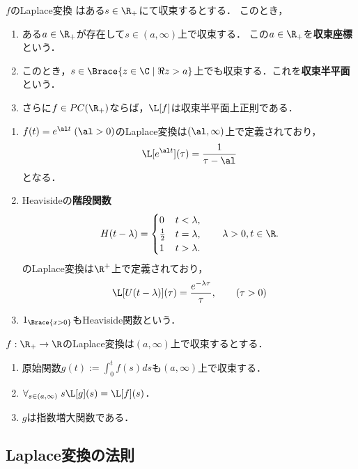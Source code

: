 \documentclass[uplatex,dvipdfmx]{jsreport}
\begin{document}
\begin{theorem}[Laplace変換の収束領域]
    $f$のLaplace変換
    はある$s\in\R_+$にて収束するとする．
    このとき，
    \begin{enumerate}
        \item ある$a\in\R_+$が存在して$s\in(a,\infty)$上で収束する．
        この$a\in\R_+$を\textbf{収束座標}という．
        \item このとき，$s\in\Brace{z\in\C\mid\Re z>a}$上でも収束する．これを\textbf{収束半平面}という．
        \item さらに$f\in PC(\R_+)$ならば，$\L[f]$は収束半平面上正則である．
    \end{enumerate}
\end{theorem}

\begin{example}[Heaviside]\mbox{}
    \begin{enumerate}
        \item $f(t)=e^{\al t}\;(\al>0)$のLaplace変換は$(\al,\infty)$上で定義されており，
        \[\L[e^{\al t}](\tau)=\frac{1}{\tau-\al}\]
        となる．
        \item Heavisideの\textbf{階段関数}
        \[H(t-\lambda)=\begin{cases}
            0&t<\lambda,\\
            \frac{1}{2}&t=\lambda,\\
            1&t>\lambda.
        \end{cases}\qquad\lambda>0,t\in\R.\]
        のLaplace変換は$\R^+$上で定義されており，
        \[\L[U(t-\lambda)](\tau)=\frac{e^{-\lambda\tau}}{\tau},\qquad(\tau>0)\]
        \item $1_{\Brace{x>0}}$もHeaviside関数という．
    \end{enumerate}
\end{example}

\begin{theorem}
    $f:\R_+\to\R$のLaplace変換は$(a,\infty)$上で収束するとする．
    \begin{enumerate}
        \item 原始関数$g(t):=\int^t_0f(s)ds$も$(a,\infty)$上で収束する．
        \item $\forall_{s\in(a,\infty)}\;s\L[g](s)=\L[f](s)$．
        \item $g$は指数増大関数である．
    \end{enumerate}
\end{theorem}

\subsection{Laplace変換の法則}
\end{document}
